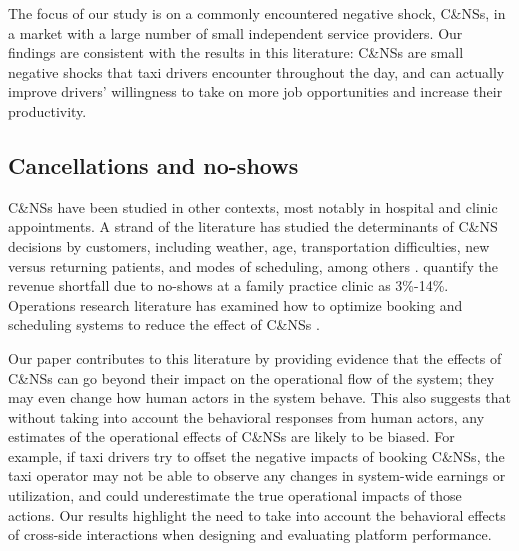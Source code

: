 \documentclass[reviewmode]{AEA}
\begin{document}
The focus of our study is on a commonly encountered negative shock, C\&NSs, in a market with a large number of small independent service providers.
Our findings are consistent with the results in this literature: C\&NSs are small negative shocks that taxi drivers encounter throughout the day, and can actually improve drivers' willingness to take on more job opportunities and increase their productivity.

\subsection{Cancellations and no-shows}

C\&NSs have been studied in other contexts, most notably in hospital and clinic appointments. A strand of the literature has studied the determinants of C\&NS decisions by customers, including weather, age, transportation difficulties, new versus returning patients, and modes of scheduling, among others \citep{norris2014empirical}. \citet{moore2001time} quantify the revenue shortfall due to no-shows at a family practice clinic as 3\%-14\%. Operations research literature has examined how to optimize booking and scheduling systems to reduce the effect of C\&NSs \citep{feldman2014appointment,patrick2008reducing}.

Our paper contributes to this literature by providing evidence that the effects of C\&NSs can go beyond their impact on the operational flow of the system; they may even change how human actors in the system behave. This also suggests that without taking into account the behavioral responses from human actors, any estimates of the operational effects of C\&NSs are likely to be biased. For example, if taxi drivers try to offset the negative impacts of booking C\&NSs, the taxi operator may not be able to observe any changes in system-wide earnings or utilization, and could underestimate the true operational impacts of those actions. Our results highlight the need to take into account the behavioral effects of cross-side interactions when designing and evaluating platform performance.
\end{document}
